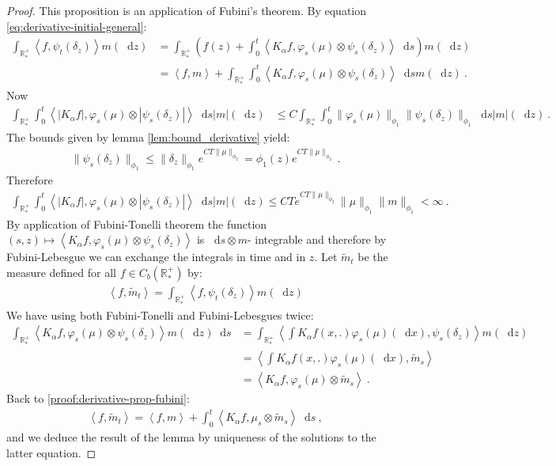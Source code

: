 \documentclass[11pt,a4paper]{article}
\newcommand{\RRP}{\mathbb{R}^+_*}
\newcommand{\brac}[1]{\left\langle#1\right\rangle}
\newcommand{\dd}{\mathop{}\!\mathrm{d}}
\begin{document}
\begin{proof}
    This proposition is an application of Fubini's theorem. By equation \eqref{eq:derivative-initial-general}:
    \begin{align}
        \int_{\RRP} \brac{f,\psi_t\left(\delta_z\right)}m(\dd z) &= \int_{\RRP}\left( f(z) + \int_0^t \brac{K_\alpha f,\varphi_s(\mu)\otimes\psi_s\left(\delta_z\right)} \dd s \right)m(\dd z) \nonumber\\
        &= \brac{f,m} + \int_{\RRP}\int_0^t \brac{K_\alpha f,\varphi_s(\mu)\otimes\psi_s\left(\delta_z\right)} \dd sm(\dd z)\ .\label{proof:derivative-prop-fubini}
    \end{align}
    Now 
    \begin{align*}
        \int_{\RRP}\int_0^t \brac{ |K_\alpha f|,\varphi_s(\mu)\otimes|\psi_s\left(\delta_z\right)|} \dd s |m|(\dd z) 
        &\leq C\int_{\RRP}\int_0^t\|\varphi_s(\mu)\|_{\phi_1}  \|\psi_s(\delta_z)\|_{\phi_1}\dd s |m|(\dd z)\ .
    \end{align*}
    The bounds given by lemma \ref{lem:bound_derivative} yield: 
    \begin{align*}
        \|\psi_s(\delta_z)\|_{\phi_1} \leq \|\delta_z\|_{\phi_1}e^{CT\|\mu\|_{\phi_2}} = \phi_1(z)e^{CT\|\mu\|_{\phi_2}}\ .
    \end{align*}
    Therefore
    \begin{align*}
        \int_{\RRP}\int_0^t \brac{ |K_\alpha f|,\varphi_s(\mu)\otimes|\psi_s\left(\delta_z\right)|} \dd s |m|(\dd z)  \leq CT e^{CT\|\mu\|_{\phi_2}}\|\mu\|_{\phi_1}\|m\|_{\phi_1} < \infty\ .
    \end{align*}
    By application of Fubini-Tonelli theorem the function $(s,z) \mapsto \brac{ K_\alpha f,\varphi_s(\mu)\otimes\psi_s\left(\delta_z\right)}$ is $\dd s \otimes m$- integrable and therefore by Fubini-Lebesgue we can exchange the integrals in time and in $z$. Let $\tilde{m}_t$ be the measure defined for all $f \in C_b(\RRP)$ by:
    \begin{align*}
        \brac{f,\tilde{m}_t} = \int_{\RRP} \brac{f,\psi_t\left(\delta_z\right)}m(\dd z)
    \end{align*}
    We have using both Fubini-Tonelli and Fubini-Lebesgues twice:
    \begin{align*}
        \int_{\RRP} \brac{K_\alpha f,\varphi_s(\mu)\otimes\psi_s\left(\delta_z\right)} m(\dd z) \dd s 
        &= \int_{\RRP} \brac{\int K_\alpha f(x,.)\varphi_s(\mu)(\dd x), \psi_s(\delta_z)} m(\dd z) \\
        &= \brac{\int K_\alpha f(x,.)\varphi_s(\mu)(\dd x),\tilde{m}_s} \\
        &= \brac{K_\alpha f, \varphi_s(\mu) \otimes \tilde{m}_s}\ .
    \end{align*}
    Back to \eqref{proof:derivative-prop-fubini}:
    \begin{align*}
        \brac{f,\tilde{m}_t} = \brac{f,m} + \int_0^t \brac{K_\alpha f, \mu_s \otimes \tilde{m}_s} \dd s\ ,
    \end{align*}
    and we deduce the result of the lemma by uniqueness of the solutions to the latter equation.
\end{proof}
\end{document}
